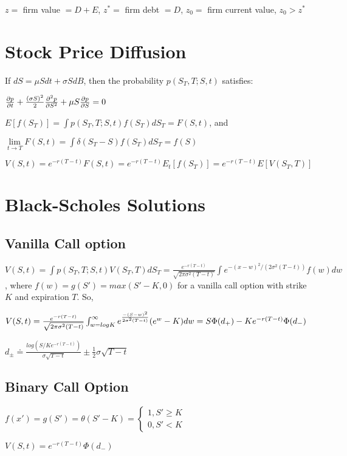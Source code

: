 $z = $ firm value $= D + E$, $z^* =$ firm debt $= D$, $z_0 = $ firm current value, $z_0 > z^*$

\section{Stock Price Diffusion}


If $dS = \mu S dt + \sigma S dB$, then the probability $p(S_T,T;S,t)$ satisfies: 

$\frac{\partial p}{\partial t} + \frac{(\sigma S)^2}{2}\frac{\partial^{2} p}{\partial S^{2}} + \mu S \frac{\partial p}{\partial S} = 0$

$E[f(S_T)] = \int p(S_T,T;S,t) f(S_T)dS_T = F(S,t)$, and 

$\lim \limits_{t \to T} F(S,t) = \int \delta(S_T - S) f(S_T)dS_T = f(S)$

$V(S,t) = e^{-r(T-t)}F(S,t) = e^{-r(T-t)}E_{t}[f(S_T)]=e^{-r(T-t)}E[V(S_T,T)]$

\section{Black-Scholes Solutions}

\subsection{Vanilla Call option}

$V(S,t) = \int p(S_T,T;S,t) V(S_T,T)dS_T = \frac{e^{-r(T-t)}}{\sqrt{2 \pi \sigma^2 (T-t)}} \int e^{-(x-w)^2/(2\sigma^2(T-t))}f(w)dw$, where $f(w) = g(S') = max(S' - K, 0)$ for a vanilla call option with strike $K$ and expiration $T$. So,

$V(S,t) = \\\frac{e^{-r(T-t)}}{\sqrt{2 \pi \sigma^2 (T-t)}} \int_{w=log K}^{\infty} e^{\frac{-(S-w)^2}{2\sigma^2(T-t)} }(e^w - K )dw = S \Phi(d_+) - Ke^{-r(T-t)}\Phi(d_-)$


$d_{\pm} \doteq \frac{log(S/Ke^{-r(T-t)})}{\sigma\sqrt{T-t}} \pm \frac{1}{2}\sigma\sqrt{T-t}$

\subsection{Binary Call Option}

$f(x') = g(S') = \theta(S' - K ) = \begin{cases} 1, S' \geq K\\ 0, S' < K\end{cases}$

$V(S,t) = e^{-r(T-t)}\Phi(d_-)$


